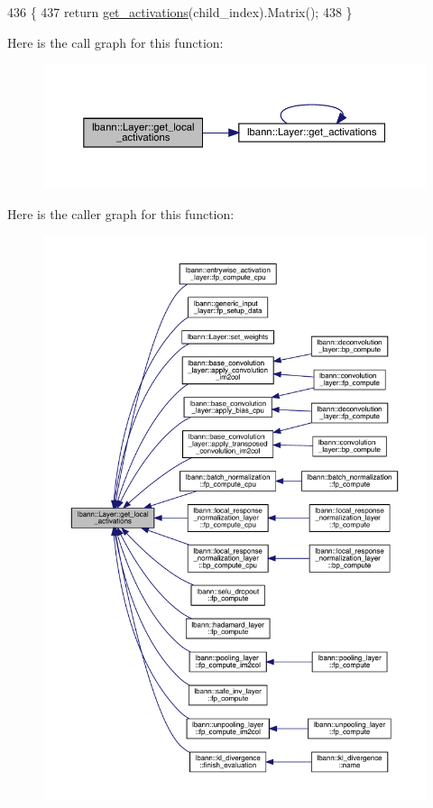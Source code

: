 \begin{DoxyCode}
436                                                  \{
437   \textcolor{keywordflow}{return} \hyperlink{classlbann_1_1Layer_a1134b1a4385af199d7272c5aa827fa99}{get\_activations}(child\_index).Matrix();
438 \}
\end{DoxyCode}
Here is the call graph for this function\+:\nopagebreak
\begin{figure}[H]
\begin{center}
\leavevmode
\includegraphics[width=350pt]{classlbann_1_1Layer_a4248f27acebf72b7b7b3ee39c8bcb62a_cgraph}
\end{center}
\end{figure}
Here is the caller graph for this function\+:\nopagebreak
\begin{figure}[H]
\begin{center}
\leavevmode
\includegraphics[width=350pt]{classlbann_1_1Layer_a4248f27acebf72b7b7b3ee39c8bcb62a_icgraph}
\end{center}
\end{figure}
